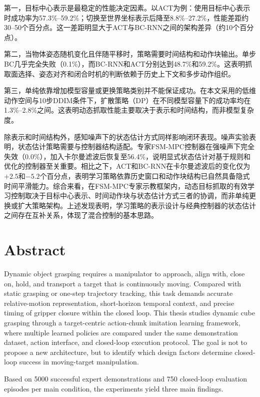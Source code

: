 第一，目标中心表示是最稳定的性能决定因素。以ACT为例：使用目标中心表示时成功率为57.3\%--59.2\%；切换至世界坐标表示后降至8.8\%--27.2\%，性能差距约30--50个百分点。这一差距明显大于ACT与BC-RNN之间的架构差异（约10个百分点）。

第二，当物体姿态随机变化且伴随平移时，策略需要时间结构和动作块输出。单步BC几乎完全失败（0.1\%），而BC-RNN和ACT分别达到48.7\%和59.2\%。这表明抓取面选择、姿态对齐和闭合时机的判断依赖于历史上下文和多步动作组织。

第三，单纯依靠增加模型容量或更换策略类别并不能保证成功。在本文采用的低维动作空间与10步DDIM条件下，扩散策略（DP）在不同模型容量下的成功率均在1.3\%--2.8\%之间。这表明动态抓取性能主要取决于表示和时间结构，而非模型复杂度。

除表示和时间结构外，感知噪声下的状态估计方式同样影响闭环表现。噪声实验表明，状态估计策略需要与控制器结构适配。专家FSM-MPC控制器在强噪声下完全失效（0.0\%），加入卡尔曼滤波后恢复至56.4\%，说明显式状态估计对基于规则和优化的控制器至关重要。相比之下，ACT和BC-RNN在卡尔曼滤波后的变化仅为$+2.5$和$-5.2$个百分点，表明学习策略依靠历史窗口和动作块结构已自然具备隐式时间平滑能力。综合来看，在FSM-MPC专家示教框架内，动态目标抓取的有效学习控制取决于目标中心表示、时间动作块与状态估计方式三者的协调，而非单纯更换或扩大策略架构。上述发现表明，学习策略的表示设计与经典控制器的状态估计之间存在互补关系，体现了混合控制的基本思路。

\chapter*{Abstract}%

Dynamic object grasping requires a manipulator to approach, align with, close on, hold, and transport a target that is continuously moving. Compared with static grasping or one-step trajectory tracking, this task demands accurate relative-motion representation, short-horizon temporal context, and precise timing of gripper closure within the closed loop. This thesis studies dynamic cube grasping through a target-centric action-chunk imitation learning framework, where multiple learned policies are compared under the same demonstration dataset, action interface, and closed-loop execution protocol. The goal is not to propose a new architecture, but to identify which design factors determine closed-loop success in moving-target manipulation.

Based on 5000 successful expert demonstrations and 750 closed-loop evaluation episodes per main condition, the experiments yield three main findings.

